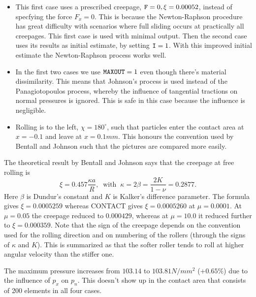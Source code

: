 \documentclass[12pt]{report}
\newcommand{\allexamp}[1]{}
\begin{document}
\begin{itemize}
\item This first case uses a prescribed creepage, ${\tt F}=0, \xi=0.00052$,
        instead of specfying the force $F_x=0$. This is because the
        Newton-Raphson procedure has great difficulty with scenarios where
        full sliding occurs at practically all creepages. This first case
        is used with minimal output. Then the second case uses its
        results as initial estimate, by setting ${\tt I}=1$. With this
        improved initial estimate the Newton-Raphson process works well.
\item In the first two cases we use ${\tt MAXOUT}=1$ even though there's
        material dissimilarity. This means that Johnson's process is used
        instead of the Panagiotopoulos process, whereby the influence of
        tangential tractions on normal pressures is ignored.
        This is safe in this case because the influence is negligible.
\item Rolling is to the left, $\chi=180^\circ$, such that particles enter
        the contact area at $x=-0.1$ and leave at $x=0.1\unit{mm}$. This
        honours the convention used by Bentall and Johnson such that the
        pictures are compared more easily.
\end{itemize}
The theoretical result by Bentall and Johnson says that the creepage at
free rolling is
\begin{equation}
  \xi = 0.457 \frac{\kappa a}{R}, \;\;\mbox{with}\;\;
  \kappa = 2\beta = \frac{2K}{1-\nu} = 0.2877.
\end{equation}
Here $\beta$ is Dundur's constant \cite[p.110]{Johnson1985} and $K$ is
Kalker's difference parameter. The formula gives $\xi=0.0005259$ whereas
CONTACT gives $\xi=0.0005260$ at $\mu=0.0001$. At $\mu=0.05$ the creepage
reduced to $0.000429$, whereas at $\mu=10.0$ it reduced further to
$\xi=0.000359$. Note that the sign of the creepage depends on the
convention used for the rolling direction and on numbering of the rollers
(through the signs of $\kappa$ and $K$). This is summarized as that
the softer roller tends to roll at higher angular velocity than the stiffer
one.

The maximum pressure increases from $103.14$ to $103.81\unit{N/mm^2}$
($+0.65\%$) due to the influence of $p_x$ on $p_n$. This doesn't show up in
the contact area that consists of 200 elements in all four cases. 
\allexamp{A case with a larger influence is shown later in Section
\ref{sec:ex_spence}.}
\end{document}
